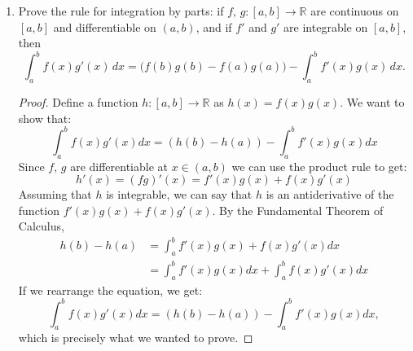 \documentclass[12pt]{amsart}
\begin{document}
\begin{enumerate}
\begin{proof}
Since $f$ is differentiable, it is continuous. Since $f$ is continuous, it is integrable.
\end{proof}

\item Prove the rule for integration by parts:  if $f,\,g : [a,b]
  \rightarrow \mathbb{R}$ are continuous on $[a,b]$ and differentiable on $(a,b)$, and if
  $f'$ and $g'$ are integrable on $[a,b]$, then 
%
\[ \int_a^b f(x)g'(x)\,dx = \big(f(b)g(b)-f(a)g(a)\big)-\int_a^b
f'(x)g(x)\,dx. \]
%

\begin{proof}
Define a function $h : [a,b] \to \mathbb R$ as $h(x) = f(x)g(x)$. We want to show that:
%
\[ \int_a^b f(x)g'(x)dx = (h(b) - h(a)) - \int_a^b f'(x)g(x)dx \]
%
Since $f,\,g$ are differentiable at $x\in (a,b)$ we can use the product rule to get:
%
\[ h'(x) = (fg)'(x) = f'(x)g(x) + f(x)g'(x) \]
%
Assuming that $h$ is integrable, we can say that $h$ is an antiderivative of the function $f'(x)g(x) + f(x)g'(x)$. By the Fundamental Theorem of Calculus,
%
\begin{align*}
h(b) - h(a) &= \int_a^b f'(x)g(x) + f(x)g'(x) dx \\
&= \int_a^b f'(x)g(x)dx + \int_a^b f(x)g'(x)dx
\end{align*}
%
If we rearrange the equation, we get:
%
\[ \int_a^b f(x)g'(x)dx = (h(b) - h(a)) - \int_a^b f'(x)g(x)dx, \]
%
which is precisely what we wanted to prove.
\end{proof}


\end{enumerate}
\end{document}
